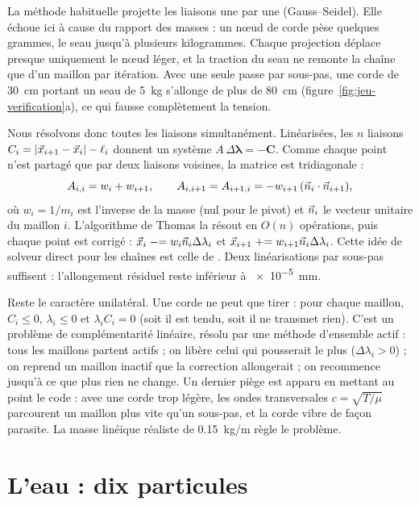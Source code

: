 La méthode habituelle projette les liaisons une par une (Gauss--Seidel). Elle
échoue ici à cause du rapport des masses : un nœud de corde pèse quelques
grammes, le seau jusqu'à plusieurs kilogrammes. Chaque projection déplace
presque uniquement le nœud léger, et la traction du seau ne remonte la chaîne
que d'un maillon par itération. Avec une seule passe par sous-pas, une corde de
\SI{30}{cm} portant un seau de \SI{5}{kg} s'allonge de plus de \SI{80}{cm}
(figure~\ref{fig:jeu-verification}a), ce qui fausse complètement la tension.

Nous résolvons donc toutes les liaisons simultanément. Linéarisées, les \(n\)
liaisons \(C_i = |\vec{x}_{i+1} - \vec{x}_i| - \ell_i\) donnent un système
\(A \, \Delta\boldsymbol{\lambda} = -\boldsymbol{C}\). Comme chaque point n'est
partagé que par deux liaisons voisines, la matrice est tridiagonale :
\begin{equation}
  A_{i,i} = w_i + w_{i+1}, \qquad
  A_{i,i+1} = A_{i+1,i} = -w_{i+1} \, (\vec{n}_i \cdot \vec{n}_{i+1}),
\end{equation}
où \(w_i = 1/m_i\) est l'inverse de la masse (nul pour le pivot) et \(\vec{n}_i\)
le vecteur unitaire du maillon \(i\). L'algorithme de Thomas
\parencite{press2007} la résout en \(O(n)\) opérations, puis chaque point est
corrigé : \(\vec{x}_i \mathrel{-}= w_i \vec{n}_i \Delta\lambda_i\) et
\(\vec{x}_{i+1} \mathrel{+}= w_{i+1} \vec{n}_i \Delta\lambda_i\). Cette idée de
solveur direct pour les chaînes est celle de \textcite{deul2018direct}. Deux
linéarisations par sous-pas suffisent : l'allongement résiduel reste inférieur à
\SI{e-5}{mm}.

Reste le caractère unilatéral. Une corde ne peut que tirer : pour chaque maillon,
\(C_i \leq 0\), \(\lambda_i \leq 0\) et \(\lambda_i C_i = 0\) (soit il est tendu, soit
il ne transmet rien). C'est un problème de complémentarité linéaire, résolu par
une méthode d'ensemble actif \parencite{nocedal2006} : tous les maillons partent
actifs ; on libère celui qui pousserait le plus (\(\Delta\lambda_i > 0\)) ; on reprend
un maillon inactif que la correction allongerait ; on recommence jusqu'à ce que
plus rien ne change. Un dernier piège est apparu en mettant au point le code :
avec une corde trop légère, les ondes transversales \(c = \sqrt{T/\mu}\) parcourent
un maillon plus vite qu'un sous-pas, et la corde vibre de façon parasite. La
masse linéique réaliste de \SI{0,15}{kg/m} règle le problème.

\section{L'eau : dix particules}
\label{sec:jeu-eau}

